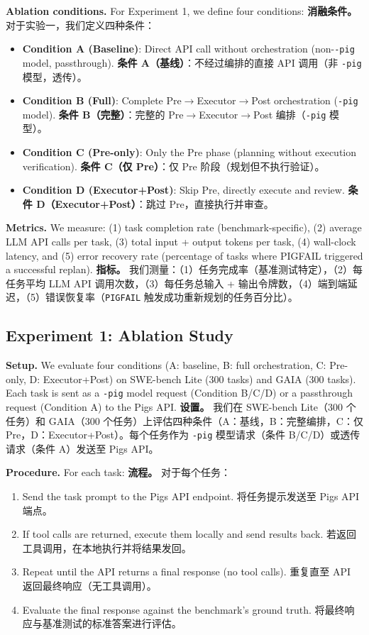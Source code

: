 \textbf{Ablation conditions.} For Experiment 1, we define four conditions:
\textbf{消融条件。} 对于实验一，我们定义四种条件：
\begin{itemize}[nosep]
    \item \textbf{Condition A (Baseline)}: Direct API call without orchestration (non-\texttt{-pig} model, passthrough).
    \textbf{条件 A（基线）}：不经过编排的直接 API 调用（非 \texttt{-pig} 模型，透传）。
    \item \textbf{Condition B (Full)}: Complete Pre$\rightarrow$Executor$\rightarrow$Post orchestration (\texttt{-pig} model).
    \textbf{条件 B（完整）}：完整的 Pre$\rightarrow$Executor$\rightarrow$Post 编排（\texttt{-pig} 模型）。
    \item \textbf{Condition C (Pre-only)}: Only the Pre phase (planning without execution verification).
    \textbf{条件 C（仅 Pre）}：仅 Pre 阶段（规划但不执行验证）。
    \item \textbf{Condition D (Executor+Post)}: Skip Pre, directly execute and review.
    \textbf{条件 D（Executor+Post）}：跳过 Pre，直接执行并审查。
\end{itemize}

\textbf{Metrics.} We measure: (1) task completion rate (benchmark-specific), (2) average LLM API calls per task, (3) total input + output tokens per task, (4) wall-clock latency, and (5) error recovery rate (percentage of tasks where PIGFAIL triggered a successful replan).
\textbf{指标。} 我们测量：（1）任务完成率（基准测试特定），（2）每任务平均 LLM API 调用次数，（3）每任务总输入 + 输出令牌数，（4）端到端延迟，（5）错误恢复率（\texttt{PIGFAIL} 触发成功重新规划的任务百分比）。

\subsection{Experiment 1: Ablation Study}

\textbf{Setup.} We evaluate four conditions (A: baseline, B: full orchestration, C: Pre-only, D: Executor+Post) on SWE-bench Lite (300 tasks) and GAIA (300 tasks). Each task is sent as a \texttt{-pig} model request (Condition B/C/D) or a passthrough request (Condition A) to the Pigs API.
\textbf{设置。} 我们在 SWE-bench Lite（300 个任务）和 GAIA（300 个任务）上评估四种条件（A：基线，B：完整编排，C：仅 Pre，D：Executor+Post）。每个任务作为 \texttt{-pig} 模型请求（条件 B/C/D）或透传请求（条件 A）发送至 Pigs API。

\textbf{Procedure.} For each task:
\textbf{流程。} 对于每个任务：
\begin{enumerate}[nosep]
    \item Send the task prompt to the Pigs API endpoint.
    将任务提示发送至 Pigs API 端点。
    \item If tool calls are returned, execute them locally and send results back.
    若返回工具调用，在本地执行并将结果发回。
    \item Repeat until the API returns a final response (no tool calls).
    重复直至 API 返回最终响应（无工具调用）。
    \item Evaluate the final response against the benchmark's ground truth.
    将最终响应与基准测试的标准答案进行评估。
\end{enumerate}

